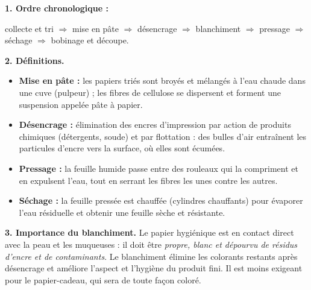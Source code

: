 \documentclass[11pt]{article}
\begin{document}
\begin{corrige}
\textbf{1. Ordre chronologique :}
\begin{center}
collecte et tri $\Rightarrow$ mise en pâte $\Rightarrow$ désencrage $\Rightarrow$ blanchiment $\Rightarrow$ pressage $\Rightarrow$ séchage $\Rightarrow$ bobinage et découpe.
\end{center}

\textbf{2. Définitions.}
\begin{itemize}
\item \textbf{Mise en pâte :} les papiers triés sont broyés et mélangés à l'eau chaude dans une cuve (pulpeur) ; les fibres de cellulose se dispersent et forment une suspension appelée pâte à papier.
\item \textbf{Désencrage :} élimination des encres d'impression par action de produits chimiques (détergents, soude) et par flottation : des bulles d'air entraînent les particules d'encre vers la surface, où elles sont écumées.
\item \textbf{Pressage :} la feuille humide passe entre des rouleaux qui la compriment et en expulsent l'eau, tout en serrant les fibres les unes contre les autres.
\item \textbf{Séchage :} la feuille pressée est chauffée (cylindres chauffants) pour évaporer l'eau résiduelle et obtenir une feuille sèche et résistante.
\end{itemize}

\textbf{3. Importance du blanchiment.} Le papier hygiénique est en contact direct avec la peau et les muqueuses : il doit être \emph{propre, blanc et dépourvu de résidus d'encre et de contaminants}. Le blanchiment élimine les colorants restants après désencrage et améliore l'aspect et l'hygiène du produit fini. Il est moins exigeant pour le papier-cadeau, qui sera de toute façon coloré.
\end{corrige}
\end{document}

